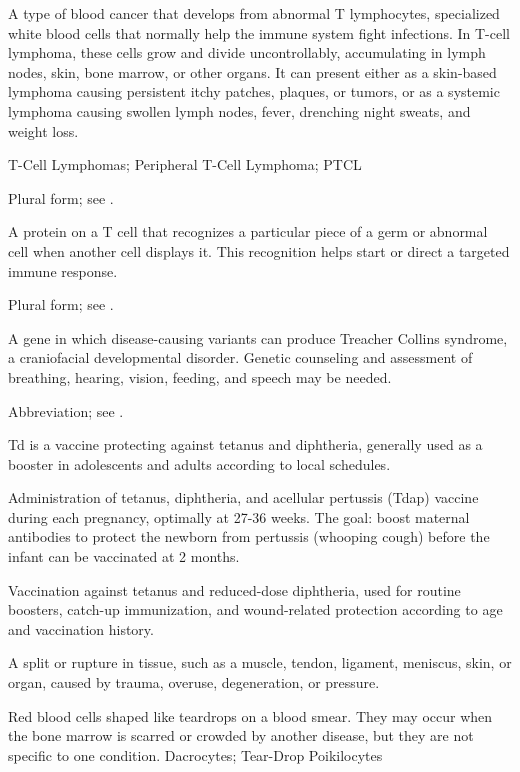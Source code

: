  A type of blood cancer that develops from abnormal T lymphocytes, specialized white blood cells that normally help the immune system fight infections. In T-cell lymphoma, these cells grow and divide uncontrollably, accumulating in lymph nodes, skin, bone marrow, or other organs. It can present either as a skin-based lymphoma causing persistent itchy patches, plaques, or tumors, or as a systemic lymphoma causing swollen lymph nodes, fever, drenching night sweats, and weight loss.

\synonyms
T-Cell Lymphomas; Peripheral T-Cell Lymphoma; PTCL

 Plural form; see .

 A protein on a T cell that recognizes a particular piece of a germ or abnormal cell when another cell displays it. This recognition helps start or direct a targeted immune response.

 Plural form; see .

 A gene in which disease-causing variants can produce Treacher Collins syndrome, a craniofacial developmental disorder. Genetic counseling and assessment of breathing, hearing, vision, feeding, and speech may be needed.

 Abbreviation; see .

 Td is a vaccine protecting against tetanus and diphtheria, generally used as a booster in adolescents and adults according to local schedules.

 Administration of tetanus, diphtheria, and acellular pertussis (Tdap) vaccine during
each pregnancy, optimally at 27-36 weeks. The goal: boost maternal antibodies to protect
the newborn from pertussis (whooping cough) before the infant can be vaccinated at 2
months.

 Vaccination against tetanus and reduced-dose diphtheria, used for routine boosters, catch-up immunization, and wound-related protection according to age and vaccination history.

 A split or rupture in tissue, such as a muscle, tendon, ligament, meniscus, skin, or organ, caused by trauma, overuse, degeneration, or pressure.

 Red blood cells shaped like teardrops on a blood smear. They may occur when the bone marrow is scarred or crowded by another disease, but they are not specific to one condition.
\synonyms
Dacrocytes; Tear-Drop Poikilocytes

